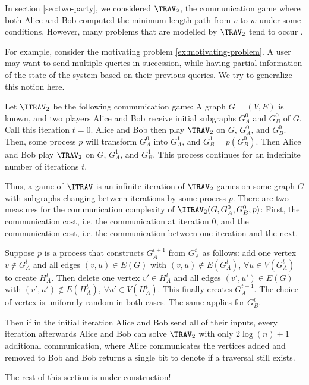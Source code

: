 In section \ref{sec:two-party}, we considered $\TRAV_2$, the communication game where both Alice and Bob computed the minimum length path from $v$ to $w$ under some conditions. However, many problems that are modelled by $\TRAV_2$ tend to occur .

For example, consider the motivating problem \ref{ex:motivating-problem}. A user may want to send multiple queries in succession, while having partial information of the state of the system based on their previous queries. We try to generalize this notion here.

\begin{definition}
Let $\ITRAV_2$ be the following communication game: A graph $G = (V,E)$ is known, and two players Alice and Bob receive initial subgraphs $G_A^0$ and $G_B^0$ of $G$. Call this iteration $t = 0$. Alice and Bob then play $\TRAV_2$ on $G$, $G_A^0$, and $G_B^0$. Then, some process $p$ will transform $G_A^0$ into $G_A^1$, and $G_B^1 = p(G_B^0)$. Then Alice and Bob play $\TRAV_2$ on $G$, $G_A^1$, and $G_B^1$. This process continues for an indefinite number of iterations $t$.

Thus, a game of $\ITRAV$ is an infinite iteration of $\TRAV_2$ games on some graph $G$ with subgraphs changing between iterations by some process $p$. There are two measures for the communication complexity of $\ITRAV_2(G,G_A^0,G_B^0,p)$: First, the  communication cost, i.e. the communication at iteration $0$, and the  communication cost, i.e. the communication between one iteration and the next.
\end{definition}

\begin{example}
Suppose $p$ is a process that constructs $G_A^{t+1}$ from $G_A^t$ as follows: add one vertex $v \notin G_A^t$ and all edges $(v,u) \in E(G)$ with $(v,u) \notin E(G_A^t)$, $\forall u \in V(G_A^t)$ to create $H_A^t$. Then delete one vertex $v' \in H_A^t$ and all edges $(v',u') \in E(G)$ with $(v',u') \notin E(H_A^t)$, $\forall u' \in V(H_A^t)$. This finally creates $G_A^{t+1}$. The choice of vertex is uniformly random in both cases. The same applies for $G_B^t$.

Then if in the initial iteration Alice and Bob send all of their inputs, every iteration afterwards Alice and Bob can solve $\TRAV_2$ with only $2\log(n) + 1$ additional communication, where Alice communicates the vertices added and removed to Bob and Bob returns a single bit to denote if a traversal still exists.
\end{example}

The rest of this section is under construction!
